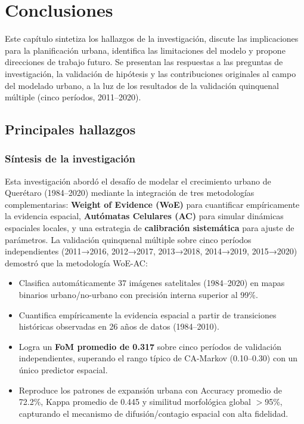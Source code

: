 
\chapter{Conclusiones}
\label{ch:conclusiones}

\begin{resumen}
Este capítulo sintetiza los hallazgos de la investigación, discute las implicaciones para la planificación urbana, identifica las limitaciones del modelo y propone direcciones de trabajo futuro. Se presentan las respuestas a las preguntas de investigación, la validación de hipótesis y las contribuciones originales al campo del modelado urbano, a la luz de los resultados de la validación quinquenal múltiple (cinco períodos, 2011--2020).
\end{resumen}

\section{Principales hallazgos}

\subsection{Síntesis de la investigación}

Esta investigación abordó el desafío de modelar el crecimiento urbano de Querétaro (1984--2020) mediante la integración de tres metodologías complementarias: \textbf{Weight of Evidence (WoE)} para cuantificar empíricamente la evidencia espacial, \textbf{Autómatas Celulares (AC)} para simular dinámicas espaciales locales, y una estrategia de \textbf{calibración sistemática} para ajuste de parámetros. La validación quinquenal múltiple sobre cinco períodos independientes (2011→2016, 2012→2017, 2013→2018, 2014→2019, 2015→2020) demostró que la metodología WoE-AC:

\begin{itemize}
	\item Clasifica automáticamente 37 imágenes satelitales (1984--2020) en mapas binarios urbano/no-urbano con precisión interna superior al 99\%.
	\item Cuantifica empíricamente la evidencia espacial a partir de transiciones históricas observadas en 26 años de datos (1984--2010).
	\item Logra un \textbf{FoM promedio de 0.317} sobre cinco períodos de validación independientes, superando el rango típico de CA-Markov (0.10--0.30) con un único predictor espacial.
	\item Reproduce los patrones de expansión urbana con Accuracy promedio de 72.2\%, Kappa promedio de 0.445 y similitud morfológica global $>$95\%, capturando el mecanismo de difusión/contagio espacial con alta fidelidad.
\end{itemize}

